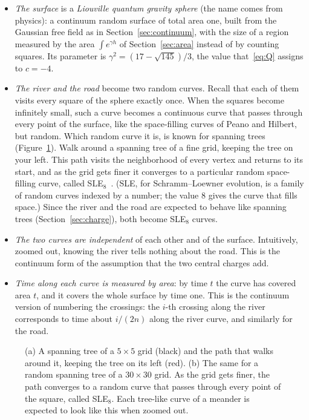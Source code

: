 \begin{itemize}
\item \emph{The surface} is a \emph{Liouville quantum gravity sphere} (the name comes from
physics): a continuum random surface of total area one, built from the Gaussian free field as in
Section~\ref{sec:continuum}, with the size of a region measured by the area $\int e^{\gamma h}$ of
Section~\ref{sec:area} instead of by counting squares. Its parameter is
$\gamma^2=(17-\sqrt{145})/3$, the value that~\eqref{eq:Q} assigns to $c=-4$.
\item \emph{The river and the road} become two random curves. Recall that each of them visits
every square of the sphere exactly once. When the squares become infinitely small, such a curve
becomes a continuous curve that passes through every point of the surface, like the
space-filling curves of Peano and Hilbert, but random. Which random curve it is, is known for
spanning trees (Figure~\ref{fig:peano}). Walk around a spanning tree of a fine grid, keeping the
tree on your left. This path visits the neighborhood of every vertex and returns to its start,
and as the grid gets finer it converges to a particular random space-filling curve, called
SLE$_8$~\cite{LSWust}. (SLE, for Schramm--Loewner evolution, is a family of random curves indexed
by a number; the value $8$ gives the curve that fills space.) Since the river and the road are
expected to behave like spanning trees (Section~\ref{sec:charge}), both become SLE$_8$ curves.
\item \emph{The two curves are independent} of each other and of the surface. Intuitively,
zoomed out, knowing the river tells nothing about the road. This is the continuum form of the
assumption that the two central charges add.
\item \emph{Time along each curve is measured by area}: by time $t$ the curve has covered area $t$,
and it covers the whole surface by time one. This is the continuum version of numbering the
crossings: the $i$-th crossing along the river corresponds to time about $i/(2n)$ along the
river curve, and similarly for the road.
\end{itemize}

\begin{figure}[ht]
\centering

\caption{(a) A spanning tree of a $5\times5$ grid (black) and the path that walks around it,
keeping the tree on its left (red). (b) The same for a random spanning tree of a $30\times30$
grid. As the grid gets finer, the path converges to a random curve that passes through every
point of the square, called SLE$_8$. Each tree-like curve of a meander is expected to look like
this when zoomed out.}
\label{fig:peano}
\end{figure}

